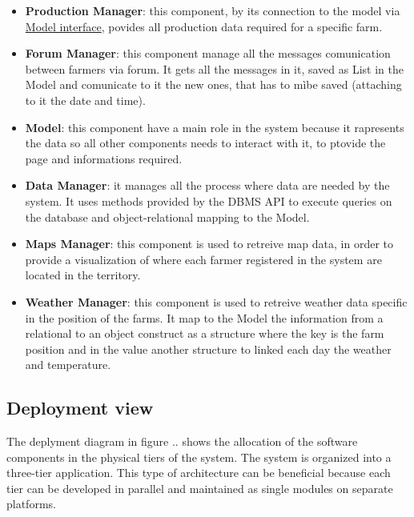 \begin{itemize}
    \item \textbf{Production Manager}: this component, by its connection to the model via \underline{Model interface}, povides all production data required for a specific farm. 
    \item \textbf{Forum Manager}: this component manage all the messages comunication between farmers via forum. It gets all the messages in it, saved as  List in the Model and comunicate to it the new ones, that has to mìbe saved (attaching to it the date and time).
    \item \textbf{Model}: this component have a main role in the system because it rapresents the data so all other components needs to interact with it, to ptovide the page and informations required.
    \item \textbf{Data Manager}: it manages all the process where data are needed by the system. It uses methods provided by the DBMS API to execute queries on the database and object-relational mapping to the Model.
    \item \textbf{Maps Manager}: this component is used to retreive map data, in order to provide a visualization of where each farmer registered in the system are located in the territory.
    \item \textbf{Weather Manager}: this component is used to retreive weather data specific in the position of the farms. It map to the Model the information from a relational to an object construct as a structure where the key is the farm position and in the value another structure to linked each day the weather and temperature.
\end{itemize}

\subsection{Deployment view}
The deplyment diagram in figure .. shows the allocation of the software components in the physical tiers of the system. 
The system is organized into a three-tier application. This type of architecture can be 
beneficial because each tier can be developed in parallel and maintained as single modules on separate platforms.



